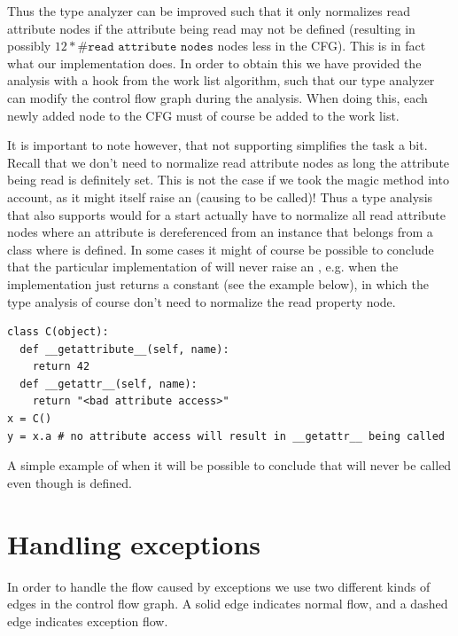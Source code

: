 Thus the type analyzer can be improved such that it only normalizes read attribute nodes if the attribute being read may not be defined (resulting in possibly $12 * \#\texttt{read attribute nodes}$ nodes less in the CFG). This is in fact what our implementation does. In order to obtain this we have provided the analysis with a hook from the work list algorithm, such that our type analyzer can modify the control flow graph during the analysis. When doing this, each newly added node to the CFG must of course be added to the work list.

It is important to note however, that not supporting  simplifies the task a bit. Recall that we don't need to normalize read attribute nodes as long the attribute being read is definitely set. This is not the case if we took the magic method  into account, as it might itself raise an  (causing  to be called)! Thus a type analysis that also supports  would for a start actually have to normalize all read attribute nodes where an attribute is dereferenced from an instance that belongs from a class where  is defined. In some cases it might of course be possible to conclude that the particular implementation of  will never raise an , e.g. when the implementation just returns a constant (see the example below), in which the type analysis of course don't need to normalize the read property node.

\begin{listing}[H]
  \begin{verbatim}
class C(object):
  def __getattribute__(self, name):
    return 42
  def __getattr__(self, name):
    return "<bad attribute access>"
x = C()
y = x.a # no attribute access will result in __getattr__ being called
  \end{verbatim}
  \caption{A simple example of when it will be possible to conclude that  will never be called even though  is defined.}
  \label{code:MagicMethods2}
\end{listing}









\section{Handling exceptions}
In order to handle the flow caused by exceptions we use two different kinds of edges in the control flow graph. 
A solid edge indicates normal flow, and a dashed edge indicates exception flow. 

